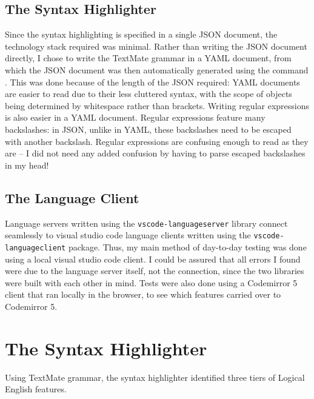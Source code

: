 \documentclass[../main.tex]{subfiles}
\begin{document}
\subsection{The Syntax Highlighter}
Since the syntax highlighting is specified in a single JSON document, the technology stack required was minimal. Rather than writing the JSON document directly, I chose to write the TextMate grammar in a YAML document, from which the JSON document was then automatically generated using the command  \cite{yq_repo}. This was done because of the length of the JSON required: YAML documents are easier to read due to their less cluttered syntax, with the scope of objects being determined by whitespace rather than brackets. Writing regular expressions is also easier in a YAML document. Regular expressions feature many backslashes: in JSON, unlike in YAML, these backslashes need to be escaped with another backslash. Regular expressions are confusing enough to read as they are -- I did not need any added confusion by having to parse escaped backslashes in my head!

\subsection{The Language Client}
Language servers written using the \texttt{vscode-languageserver} library connect seamlessly to visual studio code language clients written using the \texttt{vscode-languageclient} package. Thus, my main method of day-to-day testing was done using a local visual studio code client. I could be assured that all errors I found were due to the language server itself, not the connection, since the two libraries were built with each other in mind. Tests were also done using a Codemirror 5 client that ran locally in the browser, to see which features carried over to Codemirror 5.



\section{The Syntax Highlighter}
Using TextMate grammar, the syntax highlighter identified three tiers of Logical English features.
\end{document}
